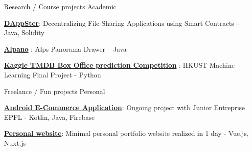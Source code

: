 

\begin{cventries}

  \cventry
    {Research / Course projects} %
    {Academic} %
    {} %
    {} %
    {
    \begin{cvitems} %
        \item \href{https://github.com/stang-l/DAppSter}{\bf DAppSter}: Decentralizing File Sharing Applications using Smart Contracts -- Java, Solidity
        \item \href{https://cs108.epfl.ch/archive/17/p/00_introduction.html}{\bf Alpano} : Alps Panorama Drawer -- Java
        \item \href{https://github.com/pierreschutz/ML_HKUST}{\bf Kaggle TMDB Box Office prediction Competition} : HKUST Machine Learning Final Project - Python 
    \end{cvitems}
    }


\cventry
    {Freelance / Fun projects}
    {Personal}
    {}
    {}
    {
     \begin{cvitems} %
        \item \href{}{\bf Android E-Commerce Application}: Ongoing project with Junior Entreprise EPFL - Kotlin, Java, Firebase
        \item \href{https://github.com/pierreschutz/pierre-website}{\bf Personal website}: Minimal personal portfolio website realized in 1 day - Vue.js, Nuxt.js
      \end{cvitems}
    }

\end{cventries}


